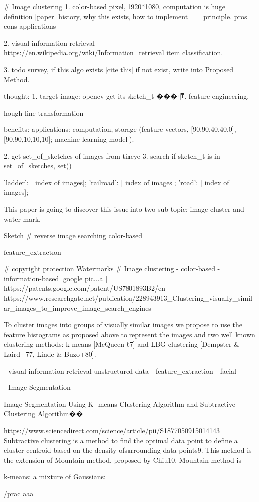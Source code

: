 # Image clustering
1. color-based pixel, 1920*1080, computation is huge
definition [paper] \cite{}
history, why this exists, 
how to implement == principle.
pros cons
applications

2. visual information retrieval
https://en.wikipedia.org/wiki/Information_retrieval
item classification.


3. todo survey, if this algo exists [cite this]
if not exist, write into Proposed Method.

thought:
1. target image: opencv get its sketch_t ���軭.  feature engineering.

hough line transformation

benefits:
applications:
computation, storage (feature vectors, [90,90,40,40,0], [90,90,10,10,10];
        machine learning model ).

2. get set_of_sketches of images from tineye
3. search if sketch_t is in set_of_sketches, set()

{
'ladder': [ index of images];
'railroad': [ index of images];
'road': [ index of images];
}

This paper is going to discover this issue into two sub-topic: image cluster and water mark.

Sketch
# reverse image searching
    color-based

    feature_extraction   

# copyright protection
    Watermarks  
# Image clustering
    - color-based
    - information-based [google pic...a ]
    https://patents.google.com/patent/US7801893B2/en  
    https://www.researchgate.net/publication/228943913_Clustering_visually_similar_images_to_improve_image_search_engines  {

To cluster images into groups of visually similar images we propose to use the feature histograms as proposed above to represent the images and two well known clustering methods: k-means [McQueen 67] and LBG clustering [Dempster & Laird+77, Linde & Buzo+80]. 
    }
        - visual information retrieval
         unstructured data
        - feature_extraction   
        - facial 

        - Image Segmentation  

Image Segmentation Using K -means Clustering Algorithm and Subtractive Clustering Algorithm��{
https://www.sciencedirect.com/science/article/pii/S1877050915014143
Subtractive clustering is a method to find the optimal data point to define a cluster centroid based on the density ofsurrounding data points9. This method is the extension of Mountain method, proposed by Chiu10. Mountain method is

}

k-means: 
a mixture of Gaussians: 

/prac aaa

